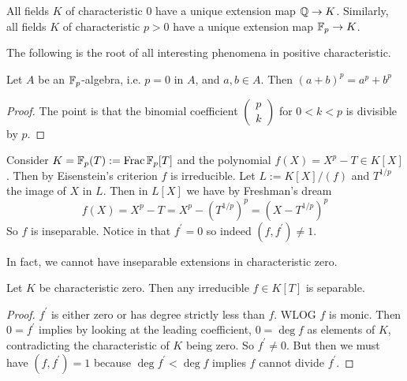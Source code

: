 \documentclass{article}
\begin{document}
\begin{eg}
  All fields $K$ of characteristic 0 have a unique 
  extension map $\mathbb{Q} \to K$.
  Similarly, all fields $K$ of characteristic $p > 0$
  have a unique extension map $\mathbb{F}_p \to K$.
\end{eg}

The following is the root of all interesting phenomena
in positive characteristic.

\begin{prop}
  
  Let $A$ be an $\mathbb{F}_p$-algebra, i.e. $p = 0$ in $A$,
  and $a , b \in A$.
  Then $(a + b)^p = a^p + b^p$
\end{prop}
\begin{proof}
  The point is that the binomial coefficient 
  $\begin{pmatrix}
    p \\ k
  \end{pmatrix}$
  for $0 < k < p$ is divisible by $p$.
\end{proof}

\begin{eg}
  Consider $K = \mathbb{F}_p(T) := \mathrm{Frac}\,\mathbb{F}_p[T]$
  and the polynomial $f(X) = X^p - T \in K[X]$.
  Then by Eisenstein's criterion $f$ is irreducible.
  Let $L := K[X] / (f)$ and $T^{1 / p}$ the image of $X$ in $L$.
  Then in $L[X]$ we have by Freshman's dream \[
    f(X) = X^p - T = X^p - (T^{1 / p})^p
    = (X - T^{1 / p})^p
  \]
  So $f$ is inseparable.
  Notice in that $f^\prime = 0$ so indeed $(f , f^\prime) \neq 1$.
\end{eg}

In fact, we cannot have inseparable extensions in characteristic zero.

\begin{prop}
  Let $K$ be characteristic zero.
  Then any irreducible $f \in K[T]$ is separable.
\end{prop}
\begin{proof}
  $f^\prime$ is either zero or has degree strictly less than $f$.
  WLOG $f$ is monic.
  Then $0 = f^\prime$ implies by looking at the leading coefficient,
  $0 = \deg f$ as elements of $K$,
  contradicting the characteristic of $K$ being zero.
  So $f^\prime \neq 0$.
  But then we must have $(f , f^\prime) = 1$ because
  $\deg f^\prime < \deg f$ implies $f$ cannot divide $f^\prime$.
\end{proof}

  
\end{document}

